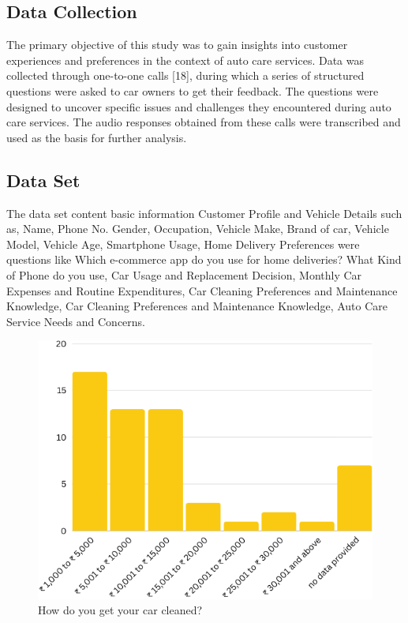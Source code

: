 \documentclass[conference]{IEEEtran}
\begin{document}
\subsection{Data Collection}\label{AA}
The primary objective of this study was to gain insights into customer experiences and preferences in the context of auto care services. Data was collected through one-to-one calls [18], during which a series of structured questions were asked to car owners to get their feedback. The questions were designed to uncover specific issues and challenges they encountered during auto care services. The audio responses obtained from these calls were transcribed and used as the basis for further analysis. 
\subsection{Data Set}
The data set content basic information Customer Profile and Vehicle Details such as, Name, Phone No. Gender, Occupation, Vehicle Make, Brand of car, Vehicle Model, Vehicle Age, Smartphone Usage, Home Delivery Preferences were questions like Which e-commerce app do you use for home deliveries? What Kind of Phone do you use, Car Usage and Replacement Decision, Monthly Car Expenses and Routine Expenditures, Car Cleaning Preferences and Maintenance Knowledge, Car Cleaning Preferences and Maintenance Knowledge, Auto Care Service Needs and Concerns. 
\begin{figure}[htbp]
\centering
\includegraphics[scale=0.5]{Fig1.png}
\caption{How do you get your car cleaned?}
\label{fig}
\end{figure}
\end{document}
